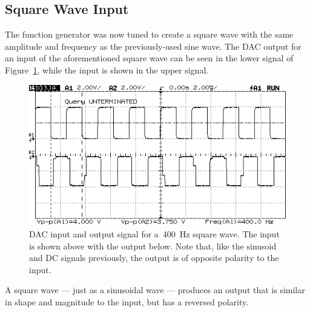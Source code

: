 \subsection{Square Wave Input}
The function generator was now tuned to create a square wave with the same amplitude and frequency as the previously-used sine wave.  The DAC output for an input of the aforementioned square wave can be seen in the lower signal of Figure~\ref{fig:pt5a}, while the input is shown in the upper signal.
%
\begin{figure}[H]
	\centering
	\includegraphics[width=.6\textwidth]{img/shot/pt5a_noopen.png}
	\parbox{.6\textwidth}{
	\caption[\SI{400}{\hertz} Square Wave --- All Closed]{DAC input and output signal for a~\SI{400}{\hertz} square wave.  The input is shown above with the output below.  Note that, like the sinusoid and DC signals previously, the output is of opposite polarity to the input.}
	\label{fig:pt5a}}
\end{figure}
%
A square wave --- just as a sinusoidal wave --- produces an output that is similar in shape and magnitude to the input, but has a reversed polarity.

